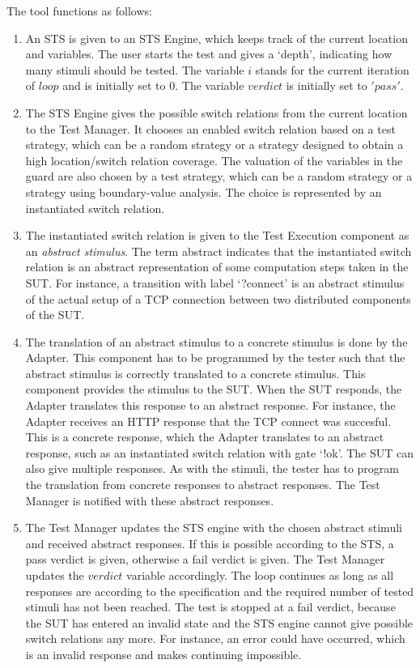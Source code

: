 The tool functions as follows: 
\begin{enumerate}
  \item An STS is given to an STS Engine, which keeps track of the current location and variables. The user starts the test and gives a `depth', indicating how many stimuli should be tested. The variable $i$ stands for the current iteration of $loop$ and is initially set to $0$. The variable $verdict$ is initially set to $'pass'$.
  \item The STS Engine gives the possible switch relations from the current location to the Test Manager. It chooses an enabled switch relation based on a test strategy, which can be a random strategy or a strategy designed to obtain a high location/switch relation coverage. The valuation of the variables in the guard are also chosen by a test strategy, which can be a random strategy or a strategy using boundary-value analysis. The choice is represented by an instantiated switch relation.
  \item The instantiated switch relation is given to the Test Execution component as an \textit{abstract stimulus}. The term abstract indicates that the instantiated switch relation is an abstract representation of some computation steps taken in the SUT. For instance, a transition with label `?connect' is an abstract stimulus of the actual setup of a TCP connection between two distributed components of the SUT. 
  \item The translation of an abstract stimulus to a concrete stimulus is done by the Adapter. This component has to be programmed by the tester such that the abstract stimulus is correctly translated to a concrete stimulus. This component provides the stimulus to the SUT. When the SUT responds, the Adapter translates this response to an abstract response. For instance, the Adapter receives an HTTP response that the TCP connect was succesful. This is a concrete response, which the Adapter translates to an abstract response, such as an instantiated switch relation with gate `!ok'. The SUT can also give multiple responses. As with the stimuli, the tester has to program the translation from concrete responses to abstract responses. The Test Manager is notified with these abstract responses.
  \item The Test Manager updates the STS engine with the chosen abstract stimuli and received abstract responses. If this is possible according to the STS, a pass verdict is given, otherwise a fail verdict is given. The Test Manager updates the $verdict$ variable accordingly. The loop continues as long as all responses are according to the specification and the required number of tested stimuli has not been reached. The test is stopped at a fail verdict, because the SUT has entered an invalid state and the STS engine cannot give possible switch relations any more. For instance, an error could have occurred, which is an invalid response and makes continuing impossible.

\end{enumerate}
